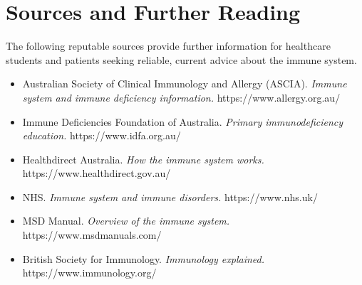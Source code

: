 \section*{Sources and Further Reading}
The following reputable sources provide further information for healthcare students and patients seeking reliable, current advice about the immune system.
\begin{itemize}
    \item Australian Society of Clinical Immunology and Allergy (ASCIA). \textit{Immune system and immune deficiency information.} https://www.allergy.org.au/
    \item Immune Deficiencies Foundation of Australia. \textit{Primary immunodeficiency education.} https://www.idfa.org.au/
    \item Healthdirect Australia. \textit{How the immune system works.} https://www.healthdirect.gov.au/
    \item NHS. \textit{Immune system and immune disorders.} https://www.nhs.uk/
    \item MSD Manual. \textit{Overview of the immune system.} https://www.msdmanuals.com/
    \item British Society for Immunology. \textit{Immunology explained.} https://www.immunology.org/
\end{itemize}
